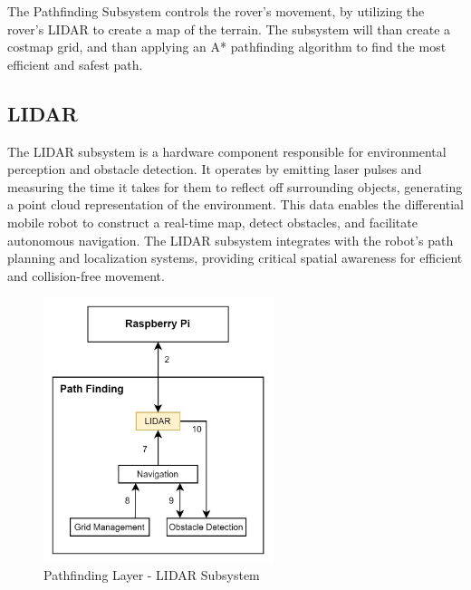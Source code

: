 


The Pathfinding Subsystem controls the rover's movement, by utilizing the rover's LIDAR to create a map of the terrain. The subsystem will than create a costmap grid, and than applying an A* pathfinding algorithm to find the most efficient and safest path.

\subsection{LIDAR}
The LIDAR subsystem is a hardware component responsible for environmental perception and obstacle detection. It operates by emitting laser pulses and measuring the time it takes for them to reflect off surrounding objects, generating a point cloud representation of the environment. This data enables the differential mobile robot to construct a real-time map, detect obstacles, and facilitate autonomous navigation. The LIDAR subsystem integrates with the robot's path planning and localization systems, providing critical spatial awareness for efficient and collision-free movement.

\begin{figure}[h!]
	\centering
 	\includegraphics[width=0.60\textwidth]{images/pathfinding/1_lidar.jpg}
 \caption{Pathfinding Layer - LIDAR Subsystem}
\end{figure}


